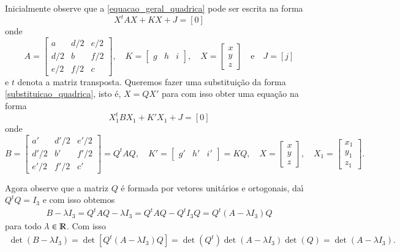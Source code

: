 Inicialmente observe que a \eqref{equacao_geral_quadrica} pode ser escrita na forma
\begin{equation}\label{equacao_matricial_quadrica}
  X^tAX + KX + J = [0]
\end{equation}
onde
\[
  A = \begin{bmatrix}
    a & d/2 & e/2\\
    d/2 & b & f/2\\
    e/2 & f/2 & c
  \end{bmatrix}
, \quad K = \begin{bmatrix}
  g & h & i
\end{bmatrix}, \quad X = \begin{bmatrix}
  x\\
  y\\
  z
\end{bmatrix}\quad\mbox{e}\quad J = [j]
\]
e $t$ denota a matriz transposta. Queremos fazer uma substitui\c{c}\~ao da forma \eqref{substituicao_quadrica}, isto \'e, $X = QX'$ para com isso obter uma equa\c{c}\~ao na forma
\[
	X_1^tBX_1 + K'X_1 + J = [0]
\]
onde
\[
	B = \begin{bmatrix}
		a' & d'/2 & e'/2\\
		d'/2 & b' & f'/2\\
		e'/2 & f'/2 & c'
	\end{bmatrix} = Q^tAQ,\quad K' = \begin{bmatrix}
		g' & h' & i'
	\end{bmatrix} = KQ,\quad X = \begin{bmatrix}
		x\\y\\z
	\end{bmatrix},\quad X_1 = \begin{bmatrix}
		x_1\\y_1\\z_1
	\end{bmatrix}.
\]

Agora observe que a matriz $Q$ \'e formada por vetores unit\'arios e ortogonais, da{\'\i} $Q^tQ = I_3$ e com isso obtemos
\begin{align*}
  B - \lambda I_3 = Q^t A Q - \lambda I_3 = Q^t A Q - Q^t I_3 Q = Q^t (A - \lambda I_3)Q
\end{align*}
para todo $\lambda \in \mathbb{R}$. Com isso
\begin{align*}
  \det(B - \lambda I_3) = \det[Q^t(A - \lambda I_3)Q] = \det(Q^t)\det(A - \lambda I_3)\det(Q) = \det(A - \lambda I_3).
\end{align*}

